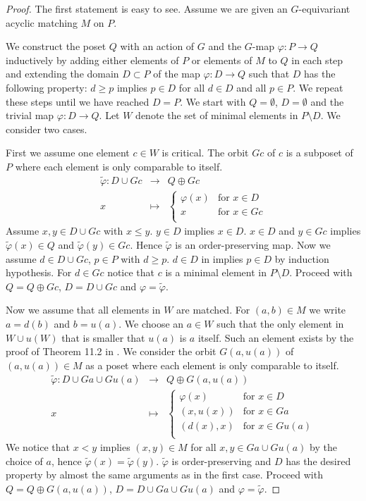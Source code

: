 \documentclass{elsarticle}
\begin{document}
\begin{proof}
The first statement is easy to see. Assume we are given an $G$-equivariant acyclic matching $M$ on $P$.

We construct the poset $Q$ with an action of $G$ and the $G$-map $\varphi:P\longrightarrow Q$ inductively by adding either elements of $P$ or elements of $M$ to $Q$ in each step and extending the domain $D\subset P$ of the map $\varphi:D\longrightarrow Q$ such that $D$ has the following property: $d\geq p$ implies $p\in D$ for all $d\in D$ and all $p\in P$. We repeat these steps until we have reached $D=P$. We start with $Q=\emptyset$, $D=\emptyset$ and the trivial map $\varphi:D\longrightarrow Q$. Let $W$ denote the set of minimal elements in $P\setminus D$. We consider two cases.

First we assume one element $c\in W$ is critical. The orbit $Gc$ of $c$ is a subposet of $P$ where each element is only comparable to itself.
\begin{eqnarray*}
\widetilde\varphi:D\cup Gc&\longrightarrow&Q\oplus Gc\\
x&\longmapsto&
\begin{cases}
\varphi(x)&\text{for $x\in D$}\\
x&\text{for $x\in Gc$}\\
\end{cases}
\end{eqnarray*}
Assume $x,y\in D\cup Gc$ with $x\leq y$. $y\in D$ implies $x\in D$. $x\in D$ and $y\in Gc$ implies $\widetilde\varphi(x)\in Q$ and $\widetilde\varphi(y)\in Gc$. Hence $\widetilde\varphi$ is an order-preserving map. Now we assume $d\in D\cup Gc$, $p\in P$ with $d\geq p$. $d\in D$ in implies $p\in D$ by induction hypothesis. For $d\in Gc$ notice that $c$ is a minimal element in $P\setminus D$. Proceed with $Q=Q\oplus Gc$, $D=D\cup Gc$ and $\varphi=\widetilde\varphi$.

Now we assume that all elements in $W$ are matched. For $(a,b)\in M$ we write $a=d(b)$ and $b=u(a)$. We choose an $a\in W$ such that the only element in $W\cup u(W)$ that is smaller that $u(a)$ is $a$ itself. Such an element exists by the proof of Theorem 11.2 in \cite[Chapter 11]{buch}. We consider the orbit $G(a,u(a))$ of $(a,u(a))\in M$ as a poset where each element is only comparable to itself.
\begin{eqnarray*}
\widetilde\varphi:D\cup Ga\cup Gu(a)&\longrightarrow&Q\oplus G(a,u(a))\\
x&\longmapsto&
\begin{cases}
\varphi(x)&\text{for $x\in D$}\\
(x,u(x))&\text{for $x\in Ga$}\\
(d(x),x)&\text{for $x\in Gu(a)$}\\
\end{cases}
\end{eqnarray*}
We notice that $x<y$ implies $(x,y)\in M$ for all $x,y\in Ga\cup Gu(a)$ by the choice of $a$, hence $\widetilde\varphi(x)=\widetilde\varphi(y)$. $\widetilde\varphi$ is order-preserving and $D$ has the desired property by almost the same arguments as in the first case. Proceed with $Q=Q\oplus G(a,u(a))$, $D=D\cup Ga\cup Gu(a)$ and $\varphi=\widetilde\varphi$.


\end{proof}
\end{document}
